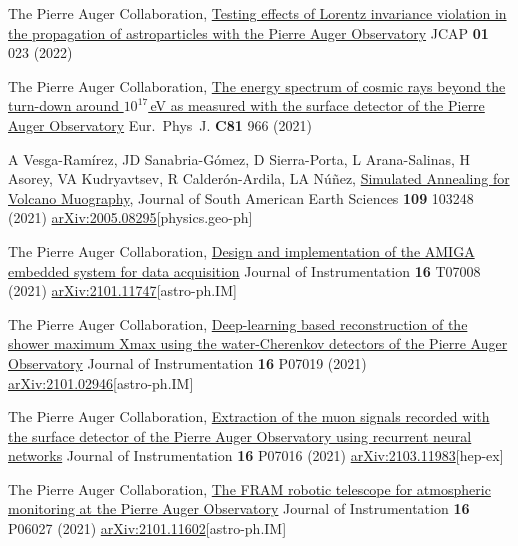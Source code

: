 \begin{etaremune}
\item {}The Pierre Auger Collaboration, \href{https://doi.org/10.1088/1475-7516/2022/01/023}{Testing effects of Lorentz invariance violation in the propagation of astroparticles with the Pierre Auger Observatory} JCAP {\textbf{01}} 023 (2022) %


\item {}The Pierre Auger Collaboration, \href{https://doi.org/10.1140/epjc/s10052-021-09700-w}{The energy spectrum of cosmic rays beyond the turn-down around $10^{17}$\,eV as measured with the surface detector of the Pierre Auger Observatory} Eur.\ Phys\  J. {\textbf{C81}} 966 (2021)

\item {} A Vesga-Ramírez, JD Sanabria-Gómez, D Sierra-Porta, L Arana-Salinas, H Asorey, VA Kudryavtsev, R Calderón-Ardila, LA Núñez, \href{https://doi.org/10.1016/j.jsames.2021.103248}{Simulated Annealing for Volcano Muography}, Journal of South American Earth Sciences {\textbf{109}} 103248 (2021) \href{https://arxiv.org/abs/2005.08295}{arXiv:2005.08295}[physics.geo-ph]

\item {}The Pierre Auger Collaboration, \href{https://doi.org/10.1088/1748-0221/16/07/T07008}{Design and implementation of the AMIGA embedded system for data acquisition} Journal of Instrumentation {\textbf{16}} T07008 (2021) \href{https://arxiv.org/abs/2101.11747}{arXiv:2101.11747}[astro-ph.IM]

\item {}The Pierre Auger Collaboration, \href{https://doi.org/10.1088/1748-0221/16/07/P07019}{Deep-learning based reconstruction of the shower maximum Xmax using the water-Cherenkov detectors of the Pierre Auger Observatory} Journal of Instrumentation {\textbf{16}} P07019 (2021) \href{https://arxiv.org/abs/2101.02946}{arXiv:2101.02946}[astro-ph.IM]

\item {}The Pierre Auger Collaboration, \href{https://doi.org/10.1088/1748-0221/16/07/P07016}{Extraction of the muon signals recorded with the surface detector of the Pierre Auger Observatory using recurrent neural networks} Journal of Instrumentation {\textbf{16}} P07016 (2021) \href{https://arxiv.org/abs/2103.11983}{arXiv:2103.11983}[hep-ex]

\item {}The Pierre Auger Collaboration, \href{https://doi.org/10.1088/1748-0221/16/06/P06027}{The FRAM robotic telescope for atmospheric monitoring at the Pierre Auger Observatory} Journal of Instrumentation {\textbf{16}} P06027 (2021) \href{https://arxiv.org/abs/2101.11602}{arXiv:2101.11602}[astro-ph.IM]


\end{etaremune}
